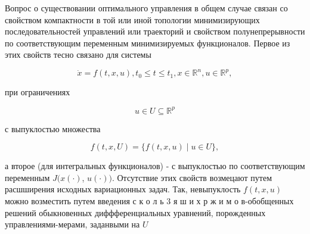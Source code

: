 \documentclass[10pt]{article}
\begin{document}
Вопрос о существовании оптимального управления в общем случае связан со свойством компактности в той или иной топологии минимизирующих последовательностей управлений или траекторий и свойством полунепрерывности по соответствующим переменным минимизируемых функционалов. Первое из этих свойств тесно связано для системы



\[

\dot{x}=f(t, x, u), t_{0} \leqslant t \leqslant t_{1}, x \in \mathbb{R}^{n}, u \in \mathbb{R}^{p},

\]



при ограничениях



\[

u \in U \subseteq \mathbb{R}^{p}

\]



с выпуклостью множества



\[

f(t, x, U)=\{f(t, x, u) \mid u \in U\},

\]



а второе (для интегральных функционалов) - с выпуклостью по соответствующим переменным $J(x(\cdot)$, $u(\cdot))$. Отсутствие этих свойств возмецают путем расшширения исходных вариационных задач. Так, невыпуклость $f(t, x, u)$ можно возместить путем введения с к о л ь 3 я ш и х р ж и м о в-обобщенных решений обыкновенных диффференциальных уравнений, порөжденных управлениями-мерами, заданвыми на $U$
\end{document}
